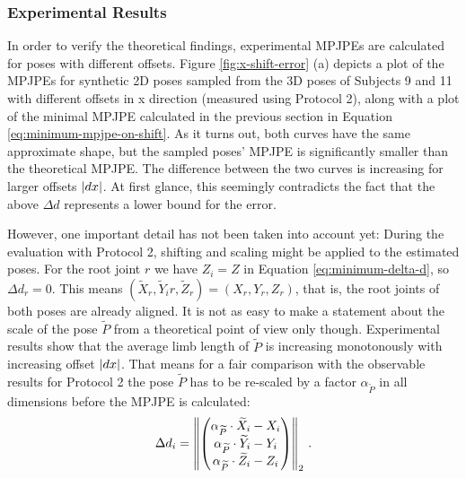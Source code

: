 
\subsubsection{Experimental Results}

In order to verify the theoretical findings, experimental MPJPEs are calculated for poses with different offsets.
Figure \ref{fig:x-shift-error} (a) depicts a plot of the MPJPEs for synthetic 2D poses sampled from the 3D poses of Subjects 9 and 11 with different offsets in x direction (measured using Protocol 2), along with a plot of the minimal MPJPE calculated in the previous section in Equation \eqref{eq:minimum-mpjpe-on-shift}.
As it turns out, both curves have the same approximate shape, but the sampled poses' MPJPE is significantly smaller than the theoretical MPJPE.
The difference between the two curves is increasing for larger offsets $\abs{dx}$.
At first glance, this seemingly contradicts the fact that the above $\Delta d$ represents a lower bound for the error.

However, one important detail has not been taken into account yet:
During the evaluation with Protocol 2, shifting and scaling might be applied to the estimated poses. 
For the root joint $r$ we have $Z_i = Z$ in Equation \eqref{eq:minimum-delta-d}, so $\Delta d_r = 0$. 
This means $(\widetilde{X}_r, \widetilde{Y}_ir, \widetilde{Z}_r) = (X_r, Y_r, Z_r)$, that is, the root joints of both poses are already aligned.
It is not as easy to make a statement about the scale of the pose $\widetilde{P}$ from a theoretical point of view only though.
Experimental results show that the average limb length of $\widetilde{P}$ is increasing monotonously with increasing offset $\abs{dx}$.
That means for a fair comparison with the observable results for Protocol 2 the pose $\widetilde{P}$ has to be re-scaled by a factor $\alpha_{\widetilde{P}}$ in all dimensions before the MPJPE is calculated:
\begin{equation}
	\Delta d_i = \norm{ 
	\begin{pmatrix}
		\alpha_{\widetilde{P}} \cdot \widetilde{X}_i - X_i \\
		\alpha_{\widetilde{P}} \cdot \widetilde{Y}_i - Y_i \\
		\alpha_{\widetilde{P}} \cdot \widetilde{Z}_i - Z_i
	\end{pmatrix}
	}_2 \ .
\end{equation}

